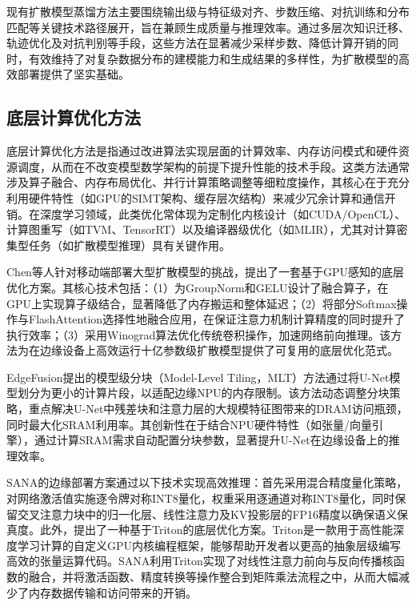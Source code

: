 \documentclass[11pt,a4paper,UTF8]{ctexart}
\begin{document}
现有扩散模型蒸馏方法主要围绕输出级与特征级对齐、步数压缩、对抗训练和分布匹配等关键技术路径展开，旨在兼顾生成质量与推理效率。通过多层次知识迁移、轨迹优化及对抗判别等手段，这些方法在显著减少采样步数、降低计算开销的同时，有效维持了对复杂数据分布的建模能力和生成结果的多样性，为扩散模型的高效部署提供了坚实基础。

\subsection{底层计算优化方法}

底层计算优化方法是指通过改进算法实现层面的计算效率、内存访问模式和硬件资源调度，从而在不改变模型数学架构的前提下提升性能的技术手段。这类方法通常涉及算子融合、内存布局优化、并行计算策略调整等细粒度操作，其核心在于充分利用硬件特性（如GPU的SIMT架构、缓存层次结构）来减少冗余计算和通信开销。在深度学习领域，此类优化常体现为定制化内核设计（如CUDA/OpenCL）、计算图重写（如TVM\cite{TVM}、TensorRT）以及编译器级优化（如MLIR\cite{mlir}），尤其对计算密集型任务（如扩散模型推理）具有关键作用。

Chen等人\cite{chen2023speed}针对移动端部署大型扩散模型的挑战，提出了一套基于GPU感知的底层优化方案。其核心技术包括：（1）为GroupNorm和GELU设计了融合算子，在GPU上实现算子级结合，显著降低了内存搬运和整体延迟；（2）将部分Softmax操作与FlashAttention\cite{dao2022flashattention}选择性地融合应用，在保证注意力机制计算精度的同时提升了执行效率；（3）采用Winograd算法优化传统卷积操作，加速网络前向推理。该方法为在边缘设备上高效运行十亿参数级扩散模型提供了可复用的底层优化范式。

EdgeFusion\cite{castells2024edgefusion}提出的模型级分块（Model-Level Tiling，MLT）方法通过将U-Net模型划分为更小的计算片段，以适配边缘NPU的内存限制。该方法动态调整分块策略，重点解决U-Net中残差块和注意力层的大规模特征图带来的DRAM访问瓶颈，同时最大化SRAM利用率。其创新性在于结合NPU硬件特性（如张量/向量引擎），通过计算SRAM需求自动配置分块参数，显著提升U-Net在边缘设备上的推理效率。

SANA\cite{xie2024sana}的边缘部署方案通过以下技术实现高效推理：首先采用混合精度量化策略，对网络激活值实施逐令牌对称INT8量化，权重采用逐通道对称INT8量化，同时保留交叉注意力块中的归一化层、线性注意力及KV投影层的FP16精度以确保语义保真度。此外，提出了一种基于Triton\cite{tillet2019triton}的底层优化方案。Triton是一款用于高性能深度学习计算的自定义GPU内核编程框架，能够帮助开发者以更高的抽象层级编写高效的张量运算代码。SANA利用Triton实现了对线性注意力前向与反向传播核函数的融合，并将激活函数、精度转换等操作整合到矩阵乘法流程之中，从而大幅减少了内存数据传输和访问带来的开销。
\end{document}
